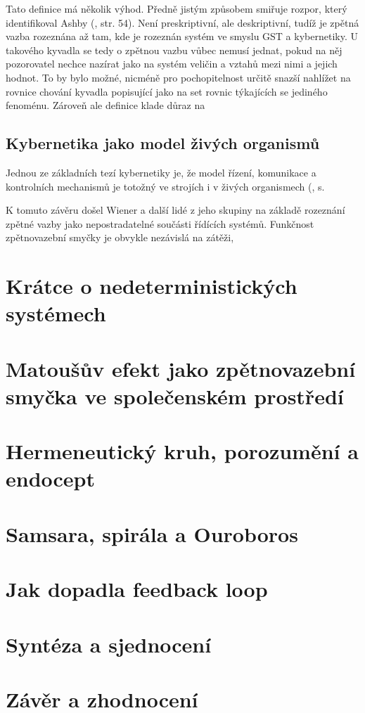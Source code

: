 \documentclass[11pt,a4paper]{article}
\begin{document}
Tato definice má několik výhod. Předně jistým způsobem smiřuje rozpor, který identifikoval Ashby (\cite*{ashby_introduction_2015}, str. 54). Není preskriptivní, ale deskriptivní, tudíž je zpětná vazba rozeznána až tam, kde je rozeznán systém ve smyslu GST a kybernetiky. U takového kyvadla se tedy o zpětnou vazbu vůbec nemusí jednat, pokud na něj pozorovatel nechce nazírat jako na systém veličin a vztahů mezi nimi a jejich hodnot. To by bylo možné, nicméně pro pochopitelnost určitě snazší nahlížet na rovnice chování kyvadla popisující jako na set rovnic týkajících se jediného fenoménu. Zároveň ale definice klade důraz na 


\subsection{Kybernetika jako model živých organismů}



Jednou ze základních tezí kybernetiky je, že model řízení, komunikace a kontrolních mechanismů je totožný ve strojích i v živých organismech (\cite{wiener_cybernetics_2019}, s. 

K tomuto závěru došel Wiener a další lidé z jeho skupiny na základě rozeznání zpětné vazby jako nepostradatelné součásti řídících systémů. Funkčnost zpětnovazební smyčky je obvykle nezávislá na zátěži,   




\section{Krátce o nedeterministických systémech}





\section{Matoušův efekt jako zpětnovazební smyčka ve společenském prostředí}




\section{Hermeneutický kruh, porozumění a endocept}




\section{Samsara, spirála a Ouroboros}




\section{Jak dopadla feedback loop}




\section{Syntéza a sjednocení}




\section{Závěr a zhodnocení}


\newpage
\printbibliography[heading=bibintoc, title={Bibliografie}]
\end{document}
